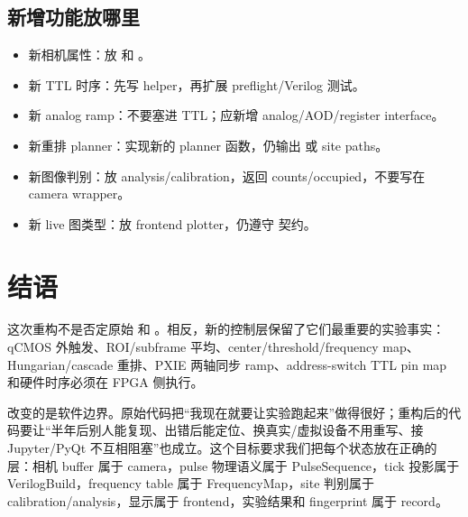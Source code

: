 \documentclass[11pt,oneside,openany]{book}
\begin{document}
\section{新增功能放哪里}
\begin{itemize}
  \item 新相机属性：放  和 。
  \item 新 TTL 时序：先写  helper，再扩展 preflight/Verilog 测试。
  \item 新 analog ramp：不要塞进  TTL；应新增 analog/AOD/register interface。
  \item 新重排 planner：实现新的 planner 函数，仍输出  或 site paths。
  \item 新图像判别：放 analysis/calibration，返回 counts/occupied，不要写在 camera wrapper。
  \item 新 live 图类型：放 frontend plotter，仍遵守  契约。
\end{itemize}

\chapter{结语}
这次重构不是否定原始  和 。相反，新的控制层保留了它们最重要的实验事实：qCMOS 外触发、ROI/subframe 平均、center/threshold/frequency map、Hungarian/cascade 重排、PXIE 两轴同步 ramp、address-switch TTL pin map 和硬件时序必须在 FPGA 侧执行。

改变的是软件边界。原始代码把“我现在就要让实验跑起来”做得很好；重构后的代码要让“半年后别人能复现、出错后能定位、换真实/虚拟设备不用重写、接 Jupyter/PyQt 不互相阻塞”也成立。这个目标要求我们把每个状态放在正确的层：相机 buffer 属于 camera，pulse 物理语义属于 PulseSequence，tick 投影属于 VerilogBuild，frequency table 属于 FrequencyMap，site 判别属于 calibration/analysis，显示属于 frontend，实验结果和 fingerprint 属于 record。
\end{document}
